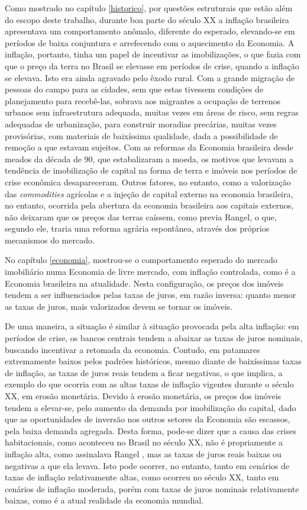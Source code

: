 \documentclass[
	12pt,				%
	oneside,			%
	a4paper,			%
	chapter=TITLE,		%
	section=TITLE,		%
	english,			%
	brazil				%
	]{abntex2}
\begin{document}
\begin{refsection}
Como mostrado no capítulo \ref{historico}, por questões estruturais que estão
além do escopo deste trabalho, durante boa parte do século XX a inflação
brasileira apresentava um comportamento anômalo, diferente do esperado,
elevando-se em períodos de baixa conjuntura e arrefecendo com o aquecimento da
Economia. A inflação, portanto, tinha um papel de incentivar as imobilizações, o
que fazia com que o preço da terra no Brasil se elevasse em períodos de crise,
quando a inflação se elevava. Isto era ainda agravado pelo êxodo rural. Com a
grande migração de pessoas do campo para as cidades, sem que estas tivessem
condições de planejamento para recebê-las, sobrava aos migrantes a ocupação de
terrenos urbanos sem infraestrutura adequada, muitas vezes em áreas de risco,
sem regras adequadas de urbanização, para construir moradias precárias, muitas
vezes provisórias, com materiais de baixíssima qualidade, dada a possibilidade
de remoção a que estavam sujeitos. Com as reformas da Economia brasileira desde
meados da década de 90, que estabalizaram a moeda, os motivos que levavam a
tendência de imobilização de capital na forma de terra e imóveis nos períodos de
crise econômica desapareceram. Outros fatores, no entanto, como a valorização
das \emph{commodities} agrícolas e a injeção de capital externo na economia
brasileira, no entanto, ocorrida pela abertura da economia brasileira aos
capitais externos, não deixaram que os preços das terras caíssem, como previa
Rangel, o que, segundo ele, traria uma reforma agrária espontânea, através dos
próprios mecanismos do mercado.

No capítulo \ref{economia}, mostrou-se o comportamento esperado do mercado
imobiliário numa Economia de livre mercado, com inflação controlada, como é a
Economia brasileira na atualidade. Nesta configuração, os preços dos imóveis
tendem a ser influenciados pelas taxas de juros, em razão inversa: quanto menor
as taxas de juros, mais valorizados devem se tornar os imóveis.

De uma maneira,
a situação é similar à situação provocada pela alta inflação: em períodos de
crise, os bancos centrais tendem a abaixar as taxas de juros nominais, buscando
incentivar a retomada da economia. Contudo, em patamares extremamente baixos
pelos padrões históricos, mesmo diante de baixíssimas taxas de inflação, as
taxas de juros reais tendem a ficar negativas, o que implica, a exemplo do que
ocorria com as altas taxas de inflação vigentes durante o século XX, em erosão
monetária. Devido à erosão monetária, os preços dos imóveis tendem a elevar-se,
pelo aumento da demanda por imobilização do capital, dado que as oportunidades
de inversão nos outros setores da Economia são escassos, pela baixa demanda
agregada. Desta forma, pode-se dizer que a causa das crises habitacionais, como
aconteceu no Brasil no século XX, não é propriamente a inflação alta, como
assinalava Rangel \autocite*{rangel}, mas as taxas de juros reais baixas ou negativas a
que ela levava. Isto pode ocorrer, no entanto, tanto em cenários de taxas de
inflação relativamente altas, como ocorreu no século XX, tanto em cenários de
inflação moderada, porém com taxas de juros nominais relativamente baixas, como
é a atual realidade da economia mundial.


\end{refsection}
\end{document}
